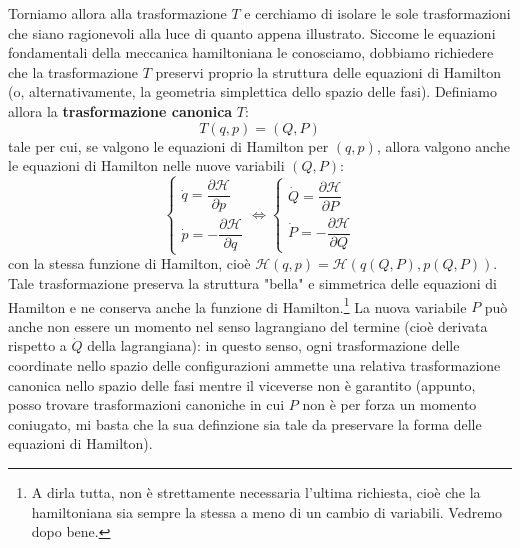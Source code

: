 \documentclass[a4paper,openany]{article}
\begin{document}
	
	Torniamo allora alla trasformazione $T$ e cerchiamo di isolare le sole trasformazioni che siano ragionevoli alla luce di quanto appena illustrato. Siccome le equazioni fondamentali della meccanica hamiltoniana le conosciamo, dobbiamo richiedere che la trasformazione $T$ preservi proprio la struttura delle equazioni di Hamilton (o, alternativamente, la geometria simplettica dello spazio delle fasi). Definiamo allora la \textbf{trasformazione canonica} $T$:
	$$
	T(q,p) = (Q,P)
	$$
	tale per cui, se valgono le equazioni di Hamilton per $(q,p)$, allora valgono anche le equazioni di Hamilton nelle nuove variabili $(Q,P)$:
	\begin{equation}\label{key}
		\begin{cases}
			\dot{q} = \dfrac{\partial \mathcal{H}}{\partial p} \\
			\dot{p} = -\dfrac{\partial \mathcal{H}}{\partial q}
		\end{cases}
		\iff
		\begin{cases}
			\dot{Q} = \dfrac{\partial \mathcal{H}}{\partial P} \\
			\dot{P} = -\dfrac{\partial \mathcal{H}}{\partial Q}
		\end{cases}
	\end{equation}
	con la stessa funzione di Hamilton, cioè $\mathcal{H}(q,p) = \mathcal{H}(q(Q,P),p(Q,P))$. Tale trasformazione preserva la struttura "bella" e simmetrica delle equazioni di Hamilton e ne conserva anche la funzione di Hamilton.\footnote{A dirla tutta, non è strettamente necessaria l'ultima richiesta, cioè che la hamiltoniana sia sempre la stessa a meno di un cambio di variabili. Vedremo dopo bene.} La nuova variabile $P$ può anche non essere un momento nel senso lagrangiano del termine (cioè derivata rispetto a $\dot{Q}$ della lagrangiana): in questo senso, ogni trasformazione delle coordinate nello spazio delle configurazioni ammette una relativa trasformazione canonica nello spazio delle fasi mentre il viceverse non è garantito (appunto, posso trovare trasformazioni canoniche in cui $P$ non è per forza un momento coniugato, mi basta che la sua definzione sia tale da preservare la forma delle equazioni di Hamilton).
\end{document}
